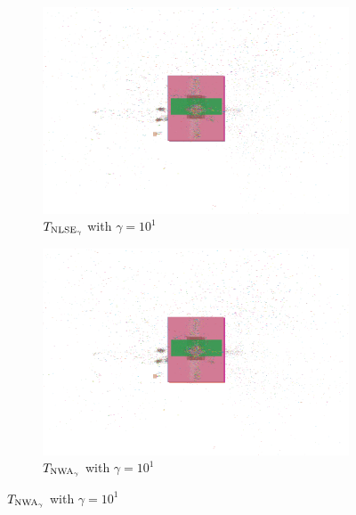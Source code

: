 \begin{figure}[p]
 \centering
 \begin{subfigure}{.48\textwidth}
  \includegraphics[width=\textwidth, frame]{baseline/convergence_Chip1_LSE_10_gamma.png}
  \caption{\(T_{\operatorname{NLSE}_\gamma}\) with \(\gamma = 10^1\)}
 \end{subfigure}
 \hfill
 \begin{subfigure}{.48\textwidth}
  \includegraphics[width=\textwidth, frame]{baseline/convergence_Chip1_WA_10_gamma.png}
  \caption{\(T_{\operatorname{NWA}_\gamma}\) with \(\gamma = 10^1\)}
 \end{subfigure}
 
 \bigskip
 

\end{figure}

